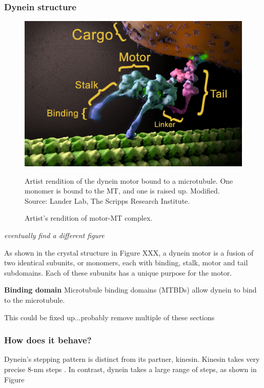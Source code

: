 \documentclass[10pt]{article} %
\begin{document}
\subsubsection{Dynein structure}

\begin{figure}[h]
  \centering
  \includegraphics[width=.65\textwidth,keepaspectratio]{../../figures/dynein-artist-rendition.jpg}
  \caption{Artist's rendition of motor-MT complex.}{Artist rendition of the dynein motor bound to a microtubule. One monomer is bound to the MT, and one is raised up. Modified. Source: Lander Lab, The Scripps Research Institute.}
  \label{dynein-artist-rendition-2}
\end{figure}

\textit{eventually find a different figure}

As shown in the crystal structure in Figure XXX, a dynein motor is a fusion of two identical subunits, or monomers, each with binding, stalk, motor and tail subdomains. Each of these subunits has a unique purpose for the motor.

\textbf{Binding domain}
Microtubule binding domains (MTBDs) allow dynein to bind to the microtubule. 



This could be fixed up...probably remove multiple of these sections

\subsubsection{How does it behave?}
Dynein's stepping pattern is distinct from its partner, kinesin. Kinesin takes very precise 8-nm steps \cite{kinesin-step-size}. In contrast, dynein takes a large range of steps, as shown in Figure \\
\end{document}
